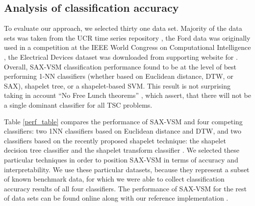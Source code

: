 \documentclass{llncs}
\begin{document}
\subsection{Analysis of classification accuracy}
To evaluate our approach, we selected thirty one data set. Majority of the data sets was taken 
from the UCR time series repository \cite{ucr}, the Ford data was originally used in a competition
at the IEEE World Congress on Computational Intelligence \cite{ford}, the Electrical Devices
dataset was downloaded from supporting website for \cite{bagnal}. Overall, SAX-VSM classification 
performance found to be at the level of best performing 1-NN classifiers (whether based on 
Euclidean distance, DTW, or SAX), shapelet tree, or a shapelet-based SVM. 
This result is not surprising taking in account ``No Free Lunch theorems'' \cite{nfl}, which 
assert, that there will not be a single dominant classifier for all TSC problems.

Table \ref{perf_table} compares the performance of SAX-VSM and four competing classifiers: 
two 1NN classifiers based on Euclidean distance and DTW, and two classifiers 
based on the recently proposed shapelet technique: the shapelet decision tree
\cite{shapelet, logical} 
classifier and the shapelet transform classifier \cite{bagnal}. 
We selected these particular 
techniques in order to position SAX-VSM in terms of accuracy and interpretability. 
We use these particular datasets, because they represent a subset of known benchmark data, 
for which we were able to collect classification accuracy results of all four classifiers. 
The performance of SAX-VSM for the rest of data sets can be found online along with 
our reference implementation \cite{jmotif}.
\end{document}
